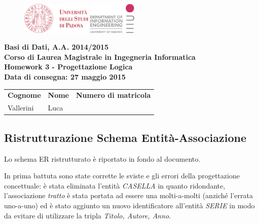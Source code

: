 \documentclass[a4paper]{scrartcl}
\newcommand{\corso}{Basi di Dati}
\newcommand{\anac}{A.A. 2014/2015}
\newcommand{\laurea}{Corso di Laurea Magistrale in Ingegneria Informatica}
\newcommand{\matricola}{1110975}
\newcommand{\nome}{Luca}
\newcommand{\cognome}{Vallerini}
\newcommand{\data}{Data di consegna: 27 maggio 2015}
\newcommand{\consegna}{Homework 3 - Progettazione Logica}
\begin{document}
\begin{footnotesize}

\begin{figure}
	\begin{minipage}[t]{\textwidth}
		\includegraphics[height=15mm]{img/logounipd}
		\hfill
		\includegraphics[height=15mm]{img/logodei}
	\end{minipage}
\end{figure}

{
\centering
\textbf{\corso , \anac} \\
\textbf{\laurea} \\
\vspace{5pt}
\textbf{\consegna} \\
\textbf{\small\data}


\begin{table}[h]
	\begin{tabularx}{\textwidth}{|X|X|X|}
		\hline
		\multicolumn{1}{|c|}{\textbf{Cognome}} &
		\multicolumn{1}{c|}{\textbf{Nome}} &
		\multicolumn{1}{c|}{\textbf{Numero di matricola}} \\
		\centering\cognome &
		\centering\nome &
		\centering\matricola \tabularnewline
		\hline
	\end{tabularx}
\end{table}

}	

\subsection*{\color[RGB]{155,0,20}Ristrutturazione Schema Entità-Associazione}
Lo schema ER ristrutturato è riportato in fondo al documento.

In prima battuta sono state corrette le sviste e gli errori della progettazione concettuale: è stata eliminata l'entità \textit{CASELLA} in quanto ridondante, l'associazione \textit{tratto} è stata portata ad essere una molti-a-molti (anziché l'errata uno-a-uno) ed è stato aggiunto un nuovo identificatore all'entità \textit{SERIE} in modo da evitare di utilizzare la tripla \textit{Titolo, Autore, Anno}. 


\end{footnotesize}
\end{document}
